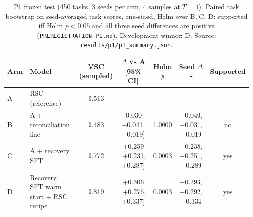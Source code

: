 \begin{table}[t]\centering\small
\begin{tabular}{llccccc}\toprule
Arm & Model & VSC (sampled) & $\Delta$ vs A [95\% CI] & Holm $p$ & Seed $\Delta$s & Supported \\\midrule
A & RSC (reference) & 0.513 & -- & -- & -- & -- \\
B & A + reconciliation line & 0.483 & $-$0.030 [$-$0.041, $-$0.019] & 1.0000 & $-$0.040, $-$0.031, $-$0.019 & no \\
C & A + recovery SFT & 0.772 & +0.259 [+0.231, +0.287] & 0.0003 & +0.238, +0.251, +0.289 & yes \\
D & Recovery SFT warm start + RSC recipe & 0.819 & +0.306 [+0.276, +0.337] & 0.0003 & +0.293, +0.292, +0.334 & yes \\
\bottomrule\end{tabular}
\caption{P1 frozen test (450 tasks, 3 seeds per arm, 4 samples at $T{=}1$). Paired task bootstrap on seed-averaged task scores, one-sided, Holm over B, C, D; supported iff Holm $p<0.05$ and all three seed differences are positive (\texttt{PREREGISTRATION\_P1.md}). Development winner: D. Source: \texttt{results/p1/p1\_summary.json}.}
\label{tab:p1}\end{table}
